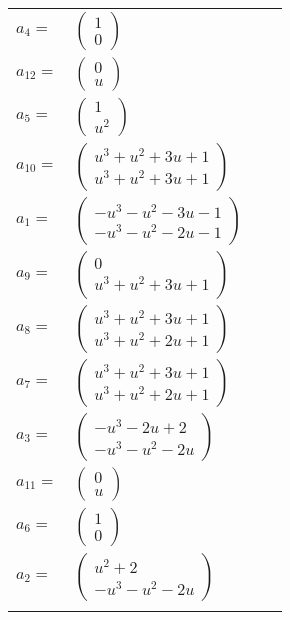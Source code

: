 \documentclass[1p]{elsarticle_modified}
\theoremstyle{definition}
\begin{document}
\begin{tabular}{m{7pt} m{180pt} m{7pt} m{180pt} }
\flushright $a_{4}=$&$\begin{pmatrix}1\\0\end{pmatrix}$ \\
\flushright $a_{12}=$&$\begin{pmatrix}0\\u\end{pmatrix}$ \\
\flushright $a_{5}=$&$\begin{pmatrix}1\\u^2\end{pmatrix}$ \\
\flushright $a_{10}=$&$\begin{pmatrix}u^3+u^2+3 u+1\\u^3+u^2+3 u+1\end{pmatrix}$ \\
\flushright $a_{1}=$&$\begin{pmatrix}- u^3- u^2-3 u-1\\- u^3- u^2-2 u-1\end{pmatrix}$ \\
\flushright $a_{9}=$&$\begin{pmatrix}0\\u^3+u^2+3 u+1\end{pmatrix}$ \\
\flushright $a_{8}=$&$\begin{pmatrix}u^3+u^2+3 u+1\\u^3+u^2+2 u+1\end{pmatrix}$ \\
\flushright $a_{7}=$&$\begin{pmatrix}u^3+u^2+3 u+1\\u^3+u^2+2 u+1\end{pmatrix}$ \\
\flushright $a_{3}=$&$\begin{pmatrix}- u^3-2 u+2\\- u^3- u^2-2 u\end{pmatrix}$ \\
\flushright $a_{11}=$&$\begin{pmatrix}0\\u\end{pmatrix}$ \\
\flushright $a_{6}=$&$\begin{pmatrix}1\\0\end{pmatrix}$ \\
\flushright $a_{2}=$&$\begin{pmatrix}u^2+2\\- u^3- u^2-2 u\end{pmatrix}$\\&\end{tabular}
\end{document}
